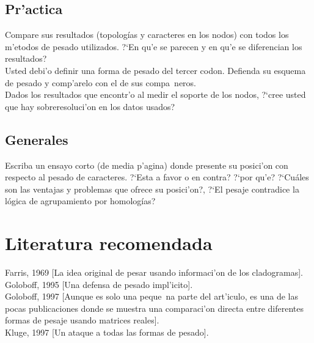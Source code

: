 \subsection{Pr'actica}
\noindent
Compare sus resultados (topolog\'ias y caracteres en los nodos) con todos los m'etodos de pesado utilizados. ?`En qu'e se parecen y en qu'e se diferencian los resultados?\\
Usted debi'o definir una forma de pesado del tercer codon. Defienda su esquema de pesado y comp'arelo con el de sus compa~neros.\\
Dados los resultados que encontr'o al medir el soporte de los nodos, ?`cree usted que hay sobreresoluci'on en los datos usados?\\
\subsection{Generales}
\noindent
Escriba un ensayo corto (de media p'agina) donde presente su posici'on con respecto al pesado de caracteres. ?`Esta a favor o en contra? ?`por qu'e? ?`Cu\'ales son las ventajas y problemas que ofrece su posici'on?, ?`El pesaje contradice la l\'ogica de agrupamiento por homolog\'ias?\\

\section{Literatura recomendada}
\noindent
Farris, 1969 [La idea original de pesar usando informaci'on de los cladogramas].\\
Goloboff, 1995 [Una defensa de pesado impl'icito].\\
Goloboff, 1997 [Aunque es solo una peque~na parte del art'iculo, es una de las pocas publicaciones donde se muestra una comparaci'on directa entre diferentes formas de pesaje usando matrices reales].\\
Kluge, 1997 [Un ataque a todas las formas de pesado].